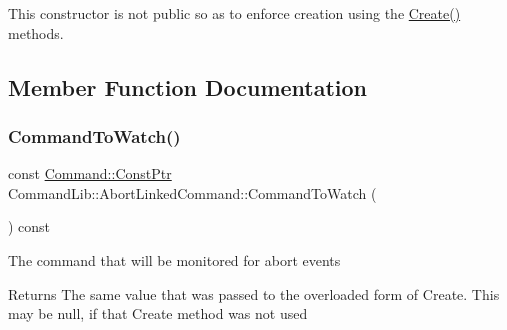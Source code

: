 This constructor is not public so as to enforce creation using the \mbox{\hyperlink{class_command_lib_1_1_abort_linked_command_ab359541aab47533699365c2d74af1c5c}{Create()}} methods. 



\subsection{Member Function Documentation}
\mbox{\label{class_command_lib_1_1_abort_linked_command_ab61bc8cebde56e75016aa5bcea1ac175}} 
\subsubsection{\texorpdfstring{Command\+To\+Watch()}{CommandToWatch()}}
{\footnotesize\ttfamily const \mbox{\hyperlink{class_command_lib_1_1_command_aee8fd78ff853a1f9c8e56959c3e81811}{Command\+::\+Const\+Ptr}} Command\+Lib\+::\+Abort\+Linked\+Command\+::\+Command\+To\+Watch (\begin{DoxyParamCaption}{ }\end{DoxyParamCaption}) const}



The command that will be monitored for abort events

\begin{DoxyReturn}{Returns}
The same value that was passed to the overloaded form of Create. This may be null, if that Create method was not used
\end{DoxyReturn}
\mbox{\label{class_command_lib_1_1_abort_linked_command_ab359541aab47533699365c2d74af1c5c}} 
